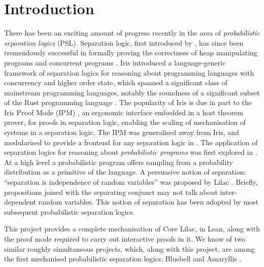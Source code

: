 \chapter{Introduction}
There has been an exciting amount of progress recently in the area of \emph{probabilistic separation logics} (PSL).
Separation logic, first introduced by \citet{og_sl}, has since been tremendously successful in formally proving the correctness of
heap manipulating programs \citep{verifast, cse-og, infer-pulse} and concurrent programs \citep{csl}.
Iris \citep{iris} introduced a
language-generic framework of separation logics for reasoning about programming languages with concurrency and higher order state,
which spanned a significant class of mainstream programming languages, notably the soundness of a significant subset
of the Rust programming language \citep{rustbelt}. The popularity of Iris is due in part to the Iris Proof Mode (IPM) \citep{ipm},
an ergonomic interface embedded in a host theorem prover, for proofs in separation logic, enabling the scaling of
mechanisation of systems in a separation logic. The IPM was generalised away from Iris, and modularised to provide a frontend for any separation logic
in \citep{mosel}.
The application of separation logics for reasoning about
\emph{probabilistic programs} was first explored in \citep{og_psl}. At a high level a probabilistic program offers sampling
from a probability distribution as a primitive of the language. A persuasive notion of separation: ``separation is independence of
random variables'' was proposed by Lilac \citep{lilac}. Briefly, propositions joined with the separating conjunct may not talk about inter-dependent random variables.
This notion of separation has been adopted by most subsequent probabilistic separation logics.

This project provides a complete mechanisation of Core Lilac, in Lean, along with the proof mode required to carry out interactive
proofs in it. We know of two similar roughly simultaneous projects, which, along with this project, are among the first mechanised
probabilistic separation logics: Bluebell \citep{bluebell} and Amaryllis \citep{amaryllis}.



